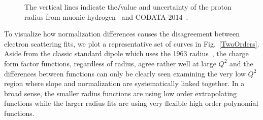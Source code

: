 \documentclass[10pt,superscriptaddress,aps,prc,twocolumn]{revtex4-1}
\begin{document}
\begin{figure}[htb]
{%
The vertical lines indicate the√value and uncertainty of the
proton radius from muonic hydrogen~\cite{Pohl:2010zza,Antognini:1900ns} and 
CODATA-2014~\cite{Mohr:2015ccw}.
}
\label{collection}
\end{figure}

To visualize how normalization differences causes the disagreement between electron scattering fits, 
we plot a representative set of curves in Fig.~\ref{TwoOrders}.
Aside from the classic standard dipole which uses the 1963 radius~\cite{Hand:1963zz}, 
the charge form factor functions, regardless of radius,
agree rather well at large $Q^2$ and the differences between functions
can only be clearly seen examining the very low $Q^2$ region where slope
and normalization are systematically linked together.
In a broad sense, the smaller radius functions are using low order extrapolating functions
while the larger radius fits are using very flexible high order polynomial functions.
\end{document}
